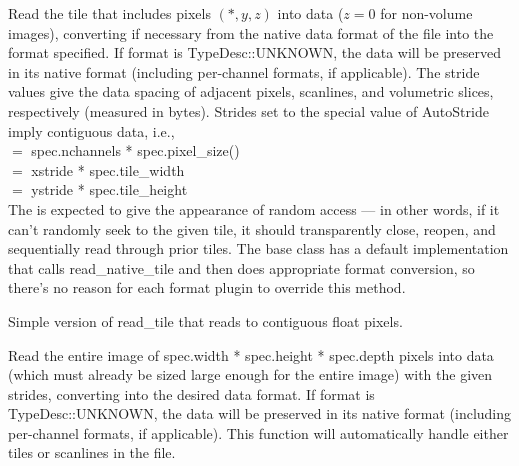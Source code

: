 Read the tile that includes pixels $(*,y,z)$ into {\kw data}
($z=0$ for non-volume images),
converting if necessary from the native data format of the file into the 
{\kw format} specified.
If {\cf format} is {\cf TypeDesc::UNKNOWN}, the data will be preserved 
in its native format (including per-channel formats, if applicable).
The stride values
give the data spacing of adjacent pixels, scanlines, and volumetric
slices, respectively (measured in bytes).  Strides set to the special
value of {\kw AutoStride} imply contiguous data, i.e., \\
 $=$ {\kw spec.nchannels * spec.pixel_size()} \\
 $=$ {\kw xstride * spec.tile_width} \\
 $=$ {\kw ystride * spec.tile_height} \\
The \ImageInput is expected to give the appearance of random access
--- in other words, if it can't randomly seek to the given tile, it
should transparently close, reopen, and sequentially read through prior
tiles.  The base \ImageInput class has a default implementation
that calls read_native_tile and then does appropriate format conversion,
so there's no reason for each format plugin to override this method.
\apiend


Simple version of {\kw read_tile} that reads to contiguous float pixels.
\apiend


Read the entire image of {\kw spec.width * spec.height * spec.depth}
pixels into data (which must already be sized large enough for
the entire image) with the given strides, converting into the desired
data format.  
If {\cf format} is {\cf TypeDesc::UNKNOWN}, the data will be preserved 
in its native format (including per-channel formats, if applicable).
This function will automatically handle either tiles or scanlines in
the file.

